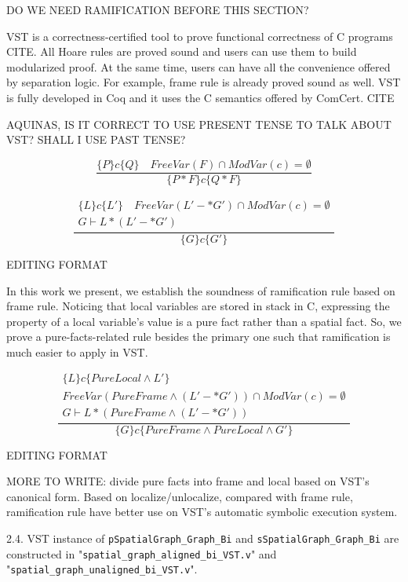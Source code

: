 DO WE NEED RAMIFICATION BEFORE THIS SECTION?

VST is a correctness-certified tool to prove functional correctness of C programs CITE. All Hoare rules are proved sound and users can use them to build modularized proof. At the same time, users can have all the convenience offered by separation logic. For example, frame rule is already proved sound as well. VST is fully developed in Coq and it uses the C semantics offered by ComCert. CITE

AQUINAS, IS IT CORRECT TO USE PRESENT TENSE TO TALK ABOUT VST? SHALL I USE PAST TENSE?

$$ \frac{\{ P \} c \{Q \} \quad FreeVar(F) \cap ModVar(c) = \emptyset } {\{P * F \} c \{ Q * F \}} $$

\[
\frac{
\begin{array}{c}
\{ L \} c \{L' \} \quad FreeVar(L' -* G') \cap ModVar(c) = \emptyset \\
G \vdash L * (L' -* G')
\end{array}
}
{\{G \} c \{ G' \}}
\]

EDITING FORMAT

In this work we present, we establish the soundness of ramification rule based on frame rule. Noticing that local variables are stored in stack in C, expressing the property of a local variable's value is a pure fact rather than a spatial fact. So, we prove a pure-facts-related rule besides the primary one such that ramification is much easier to apply in VST.

\[
\frac
{
\begin{array}{c}
\{ L \} c \{PureLocal \wedge L' \} \\ 
FreeVar(PureFrame \wedge (L' -* G')) \cap ModVar(c) = \emptyset \\
G \vdash L * (PureFrame \wedge (L' -* G'))
\end{array}
} {\{G \} c \{ PureFrame \wedge PureLocal \wedge G' \}}
\]

EDITING FORMAT


MORE TO WRITE: divide pure facts into frame and local based on VST's canonical form. Based on localize/unlocalize, compared with frame rule, ramification rule have better use on VST's automatic symbolic execution system.





2.4. VST instance of \texttt{pSpatialGraph\_Graph\_Bi} and \texttt{sSpatialGraph\_Graph\_Bi} are constructed in "\texttt{spatial\_graph\_aligned\_bi\_VST.v}" and "\texttt{spatial\_graph\_unaligned\_bi\_VST.v}".

